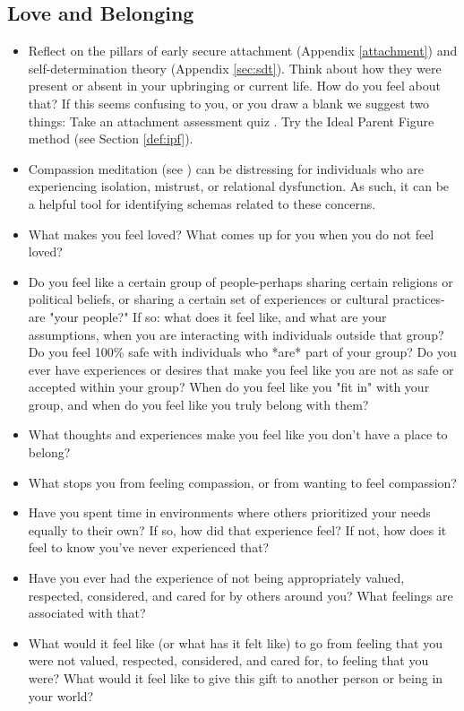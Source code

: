 \documentclass[12pt,letterpaper]{book}
\begin{document}
\subsection*{Love and Belonging}
\begin{itemize}
    \item Reflect on the pillars of early secure attachment (Appendix \ref{attachment}) and self-determination theory (Appendix \ref{sec:sdt}). Think about how they were present or absent in your upbringing or current life. How do you feel about that? If this seems confusing to you, or you draw a blank we suggest two things: Take an attachment assessment quiz \cite{attachmentProject}. Try the Ideal Parent Figure method (see Section \ref{def:ipf}).
    \item Compassion meditation (see \textcite{lkMeditation}) can be distressing for individuals who are experiencing isolation, mistrust, or relational dysfunction. As such, it can be a helpful tool for identifying schemas related to these concerns.
    \item What makes you feel loved? What comes up for you when you do not feel loved?
    \item Do you feel like a certain group of people-perhaps sharing certain religions or political beliefs, or sharing a certain set of experiences or cultural practices-are "your people?" If so: what does it feel like, and what are your assumptions, when you are interacting with individuals outside that group? Do you feel 100\% safe with individuals who *are* part of your group? Do you ever have experiences or desires that make you feel like you are not as safe or accepted within your group? When do you feel like you "fit in" with your group, and when do you feel like you truly belong with them?
    \item What thoughts and experiences make you feel like you don't have a place to belong?
    \item What stops you from feeling compassion, or from wanting to feel compassion?
    \item Have you spent time in environments where others prioritized your needs equally to their own? If so, how did that experience feel? If not, how does it feel to know you've never experienced that?
    \item Have you ever had the experience of not being appropriately valued, respected, considered, and cared for by others around you? What feelings are associated with that?
    \item What would it feel like (or what has it felt like) to go from feeling that you were not valued, respected, considered, and cared for, to feeling that you were? What would it feel like to give this gift to another person or being in your world?

\end{itemize}
\end{document}
